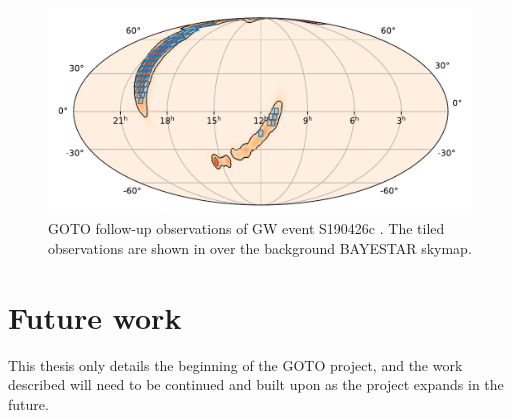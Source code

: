 \begin{colsection}
\begin{figure}[p]
    \begin{center}
        \includegraphics[width=0.9\linewidth]{images/190426_goto.pdf}
    \end{center}
    \caption[Follow-up observations of S190426c with GOTO]{
        GOTO follow-up observations of GW event S190426c \citep{S190426c_GOTO}. The tiled observations are shown in  over the background BAYESTAR skymap.
        }\label{fig:190426_goto}
\end{figure}

\clearpage

\end{colsection}


\section{Future work}
\label{sec:future}


\begin{colsection}

This thesis only details the beginning of the GOTO project, and the work described will need to be continued and built upon as the project expands in the future.

\end{colsection}



